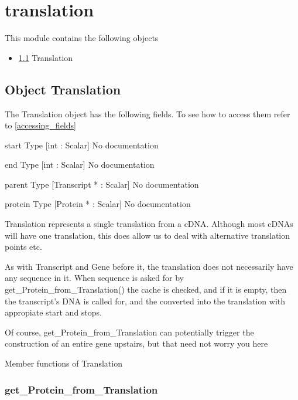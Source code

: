 \section{translation}
\label{module_translation}
This module contains the following objects

\begin{itemize}
\item \ref{object_Translation} Translation

\end{itemize}
\subsection{Object Translation}

\label{object_Translation}

The Translation object has the following fields. To see how to access them refer to \ref{accessing_fields}
\begin{description}
\item{start} Type [int : Scalar] No documentation

\item{end} Type [int : Scalar] No documentation

\item{parent} Type [Transcript * : Scalar] No documentation

\item{protein} Type [Protein * : Scalar] No documentation

\end{description}


Translation represents a single translation from
a cDNA. Although most cDNAs will have one translation, 
this does allow us to deal with alternative translation 
points etc.


As with Transcript and Gene before it, the 
translation does not necessarily have any
sequence in it. When sequence is asked for by
get_Protein_from_Translation() the cache is checked,
and if it is empty, then the transcript's DNA
is called for, and the converted into the translation
with appropiate start and stops.


Of course, get_Protein_from_Translation can
potentially trigger the construction of an entire
gene upstairs, but that need not worry you here




Member functions of Translation

\subsubsection{get_Protein_from_Translation}

